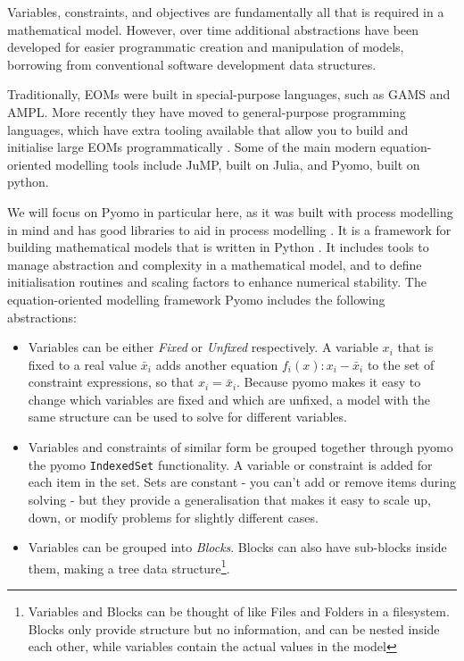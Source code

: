 Variables, constraints, and objectives are fundamentally all that is
required in a mathematical model. However, over time additional
abstractions have been developed for easier programmatic creation and
manipulation of models, borrowing from conventional software development
data structures.

Traditionally, EOMs were built in special-purpose languages, such as
GAMS and AMPL. More recently they have moved to general-purpose
programming languages, which have extra tooling available that allow you
to build and initialise large EOMs programmatically
\citep{jusevivcius2021experimental}. Some of the main modern
equation-oriented modelling tools include JuMP, built on Julia, and
Pyomo, built on python.

We will focus on Pyomo in particular here, as it was built with process
modelling in mind and has good libraries to aid in process modelling
\citep{hart2011pyomo}. It is a framework for building mathematical
models that is written in Python . It includes tools to manage
abstraction and complexity in a mathematical model, and to define
initialisation routines and scaling factors to enhance numerical
stability. The equation-oriented modelling framework Pyomo includes the
following abstractions:

\begin{itemize}
\tightlist
\item
  Variables can be either \emph{Fixed} or \emph{Unfixed} respectively. A
  variable \(x_i\) that is fixed to a real value \(\bar{x}_i\) adds
  another equation \(f_i(x): x_i - \bar{x}_i\) to the set of constraint
  expressions, so that \(x_i = \bar{x}_i\). Because pyomo makes it easy
  to change which variables are fixed and which are unfixed, a model
  with the same structure can be used to solve for different variables.
\item
  Variables and constraints of similar form be grouped together through
  pyomo the pyomo \texttt{IndexedSet} functionality. A variable or
  constraint is added for each item in the set. Sets are constant - you
  can't add or remove items during solving - but they provide a
  generalisation that makes it easy to scale up, down, or modify
  problems for slightly different cases.\\
\item
  Variables can be grouped into \emph{Blocks}. Blocks can also have
  sub-blocks inside them, making a tree data structure\footnote{Variables
    and Blocks can be thought of like Files and Folders in a filesystem.
    Blocks only provide structure but no information, and can be nested
    inside each other, while variables contain the actual values in the
    model}.
\end{itemize}


